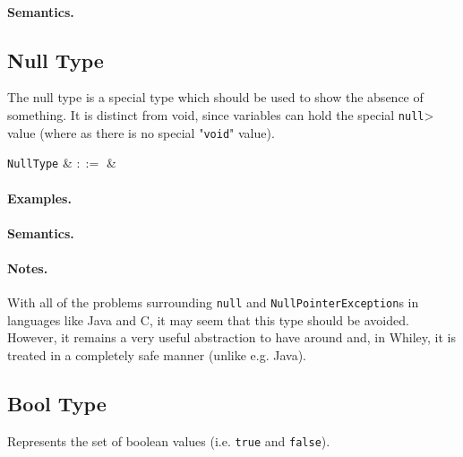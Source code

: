 \paragraph{Semantics.}


\subsection{Null Type}

The null type is a special type which should be used to show the absence of something. It is distinct from void, since variables can hold the special \lstinline{null}> value (where as there is no special "\lstinline{void}" value).

\begin{syntax}
  \verb+NullType+ & $::=$ &  \\
\end{syntax}

\paragraph{Examples.}

\paragraph{Semantics.}

\paragraph{Notes.}  With all of the problems surrounding
\lstinline{null} and \lstinline{NullPointerException}s in languages
like Java and C, it may seem that this type should be
avoided. However, it remains a very useful abstraction to have around
and, in Whiley, it is treated in a completely safe manner (unlike
e.g. Java).


\subsection{Bool Type}

Represents the set of boolean values (i.e. \lstinline{true} and \lstinline{false}).

